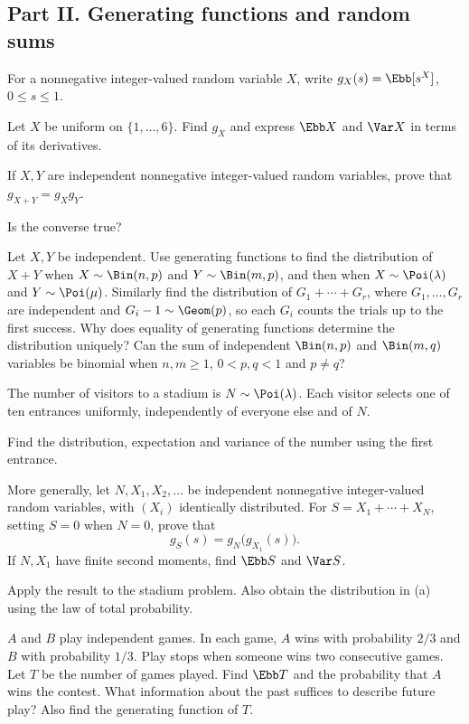 \subsection*{Part II. Generating functions and random sums}
\begin{problempencil}[Test 1, CS 2024]
For a nonnegative integer-valued random variable $X$, write $g_X(s)=\Ebb[s^X]$, $0\le s\le1$.
\begin{enumeratea}
  \item Let $X$ be uniform on $\{1,\ldots,6\}$. Find $g_X$ and express
  $\Ebb X$ and $\Var X$ in terms of its derivatives.
  \item If $X,Y$ are independent nonnegative integer-valued random variables,
  prove that $g_{X+Y}=g_Xg_Y$.
  \item[$(\mathrm{c})^\star$] Is the converse true?
\end{enumeratea}
\end{problempencil}
\begin{problembook}
Let $X,Y$ be independent. Use generating functions to find the distribution of
$X+Y$ when $X\sim\Bin(n,p)$ and $Y\sim\Bin(m,p)$, and then when
$X\sim\Poi(\lambda)$ and $Y\sim\Poi(\mu)$. Similarly find the distribution of
$G_1+\cdots+G_r$, where $G_1,\ldots,G_r$ are independent and $G_i-1\sim\Geom(p)$,
so each $G_i$ counts the trials up to the first success. Why does equality of
generating functions determine the distribution uniquely? Can the sum of independent
$\Bin(n,p)$ and $\Bin(m,q)$ variables be binomial when $n,m\ge1$, $0<p,q<1$ and $p\ne q$?
\end{problembook}
\begin{problempencil}
The number of visitors to a stadium is $N\sim\Poi(\lambda)$. Each visitor selects
one of ten entrances uniformly, independently of everyone else and of $N$.
\begin{enumeratea}
  \item Find the distribution, expectation and variance of the number using the first entrance.
  \item More generally, let $N,X_1,X_2,\ldots$ be independent nonnegative
  integer-valued random variables, with $(X_i)$ identically distributed.
  For $S=X_1+\cdots+X_N$, setting $S=0$ when $N=0$, prove that
  \[ g_S(s)=g_N\bigl(g_{X_1}(s)\bigr). \]
  If $N,X_1$ have finite second moments, find $\Ebb S$ and $\Var S$.
  \item Apply the result to the stadium problem. Also obtain the distribution
  in (a) using the law of total probability.
\end{enumeratea}
\end{problempencil}
\begin{problembook}
$A$ and $B$ play independent games. In each game, $A$ wins with probability $2/3$
and $B$ with probability $1/3$. Play stops when someone wins two consecutive games.
Let $T$ be the number of games played. Find $\Ebb T$ and the probability that
$A$ wins the contest. What information about the past suffices to describe future
play? Also find the generating function of $T$.
\end{problembook}
